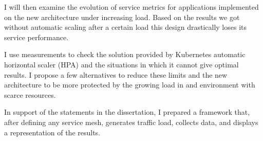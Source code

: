 I will then examine the evolution of service metrics for applications implemented on the new architecture under increasing load. 
Based on the results we got without automatic scaling after a certain load this design drastically loses its service performance.

I use measurements to check the solution provided by Kubernetes automatic horizontal scaler (HPA) and the situations in which it cannot give optimal results.
I propose a few alternatives to reduce these limits and the new architecture to be more protected by the growing load in and environment with scarce resources.

In support of the statements in the dissertation, I prepared a framework that, after defining any service mesh, generates traffic load, collects data, and displays a representation of the results.

\vfill
\selectthesislanguage

\setcounter{romanPage}{\value{page}}
